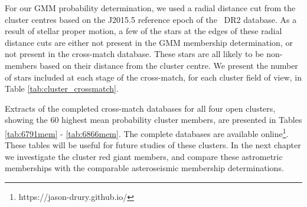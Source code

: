 
\label{sect:cuts}

For our GMM probability determination, we used a radial distance cut from the cluster centres based on the J2015.5 reference epoch of the \Gaia~DR2 database. As a result of stellar proper motion, a few of the stars at the edges of these radial distance cuts are either not present in the GMM membership determination, or not present in the cross-match database. These stars are all likely to be non-members based on their distance from the cluster centre. We present the number of stars included at each stage of the cross-match, for each cluster field of view, in Table \ref{tab:cluster_crossmatch}. 

Extracts of the completed cross-match databases for all four open clusters, showing the 60 highest mean probability cluster members, are presented in Tables \ref{tab:6791mem} - \ref{tab:6866mem}. The complete databases are available online\footnote[2]{https://jason-drury.github.io/}. These tables will be useful for future studies of these clusters. In the next chapter we investigate the cluster red giant members, and compare these astrometric memberships with the comparable asteroseismic membership determinations.

